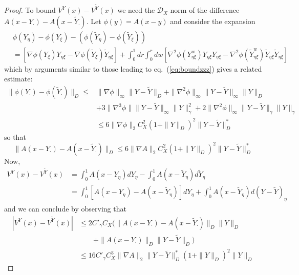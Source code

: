 \documentclass[a4paper,12pt,reqno]{amsart}
\newcommand{\wt}{\widetilde}
\newcommand{\norm}[1]{\|#1\|}
\newcommand{\DX}{\mathscr{D}_{X}}
\begin{document}
\begin{proof}
To bound $V^Y(x)-V^{\wt Y}(x)$ we need the $\DX$ norm of the
difference $A(x-Y_\cdot)-A(x-\wt Y_\cdot)$. Let $\phi(y) = A(x-y)$
and consider the expansion
\begin{equation*}
  \begin{split}
  & \phi(Y_\eta) - \phi(Y_\xi)  - (\phi(\wt Y_\eta) - \phi(\wt Y_\xi))
\\ & =\left[ \nabla\phi(Y_{\xi})
  Y_{\eta\xi}-\nabla\phi(\wt Y_{\xi}) \wt Y_{\eta\xi}\right]
+ \int_0^1 dr\int_0^r dw \left[ \nabla^2\phi(Y_{\eta\xi}^w)
  Y_{\eta\xi} Y_{\eta\xi}-\nabla^2\phi(\wt Y_{\eta\xi}^w) \wt Y_{\eta\xi}\wt Y_{\eta\xi}\right]
  \end{split}
\end{equation*}
which by arguments similar to those leading to eq.~(\ref{eq:boundzzz})
gives a related estimate:
\begin{equation*}
  \begin{split}
 \norm{\phi(Y_\cdot)-\phi(\wt Y_\cdot)}_D \le &
\norm{\nabla \phi}_\infty \norm{Y-\wt Y}_D + \norm{\nabla^2
  \phi}_\infty \norm{Y-\wt Y}_\infty \norm{Y}_D
\\
& + 3 \norm{\nabla^3 \phi} \norm{Y-\wt Y}_\infty \norm{Y}^2_\gamma + 2
\norm{\nabla^2 \phi}_\infty  \norm{Y-\wt Y}_\gamma \norm{ Y}_\gamma
\\ & \le 6 \norm{\nabla \phi}_2 C_X^2 (1+\norm{Y}_D)^2\norm{Y-\wt Y}_D^*
  \end{split}
\end{equation*}
so that
\begin{equation*}
\norm{A(x-Y_\cdot)-A(x-\wt Y_\cdot)}_D \le 6
\norm{\nabla A}_2 C_X^2 (1+\norm{Y}_D)^2\norm{Y-\wt Y}_D^*
\end{equation*}
Now,
\begin{equation*}
  \begin{split}
V^Y(x)-V^{\wt Y}(x) & = \int_0^1 A(x-Y_\eta) dY_\eta- \int_0^1 A(x-\wt
 Y_\eta) d\wt Y_\eta
\\ & =\int_0^1 [A(x-Y_\eta)-A(x-\wt Y_\eta)]dY_\eta + \int_0^1 A(x-\wt
 Y_\eta) d(Y-\wt Y)_\eta
  \end{split}
\end{equation*}
and we can conclude by observing that
\begin{equation*}
  \begin{split}
|V^Y(x)-V^{\wt Y}(x)| & \le 2 C'_\gamma C_X
(\norm{A(x-Y_\cdot)-A(x-\wt Y_\cdot)}_D\norm{Y}_D
\\ & \qquad +\norm{A(x-Y_\cdot)}_D \norm{Y-\wt
 Y}_D)
\\ & \le  16 C'_\gamma C_X^3 \norm{\nabla A}_2 \norm{Y-\wt Y}_D^*
  (1+\norm{Y}_D)^2 \norm{Y}_D
  \end{split}
\end{equation*}


\end{proof}
\end{document}
